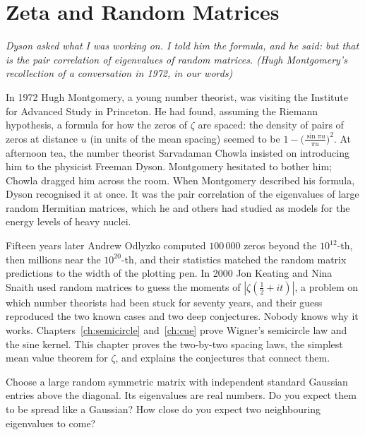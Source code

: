 \chapter{Zeta and Random Matrices}\label{moments:ch:zetarmt}

\begin{center}\itshape
Dyson asked what I was working on. I told him the formula, and he said: but that is the pair correlation of eigenvalues of random matrices.
\upshape(Hugh Montgomery's recollection of a conversation in 1972, in our words)
\end{center}

In 1972 Hugh Montgomery, a young number theorist, was visiting the Institute for Advanced Study in Princeton. He had
found, assuming the Riemann hypothesis, a formula for how the zeros of $\zeta$ are spaced: the density of pairs of zeros at distance $u$ (in units of
the mean spacing) seemed to be $1-\bigl(\frac{\sin\pi u}{\pi u}\bigr)^2$. At afternoon tea, the number theorist Sarvadaman Chowla insisted on
introducing him to the physicist Freeman Dyson. Montgomery hesitated to bother him; Chowla dragged him across the room. When Montgomery described his
formula, Dyson recognised it at once. It was the pair correlation of the eigenvalues of large random Hermitian matrices, which he and others had
studied as models for the energy levels of heavy nuclei.

Fifteen years later Andrew Odlyzko computed $100\,000$ zeros beyond the $10^{12}$-th, then millions near the $10^{20}$-th, and their statistics matched
the random matrix predictions to the width of the plotting pen. In 2000 Jon Keating and Nina Snaith used random matrices to guess the moments of
$|\zeta(\frac12+it)|$, a problem on which number theorists had been stuck for seventy years, and their guess reproduced the two known cases and two
deep conjectures. Nobody knows why it works. Chapters~\ref{ch:semicircle} and~\ref{ch:cue} prove Wigner's semicircle law and the sine kernel. This chapter proves the two-by-two spacing laws, the simplest mean value theorem for $\zeta$, and explains the conjectures that connect them.

\begin{think}
Choose a large random symmetric matrix with independent standard Gaussian entries above the diagonal. Its eigenvalues are real numbers. Do you expect them
to be spread like a Gaussian? How close do you expect two neighbouring eigenvalues to come?
\end{think}

